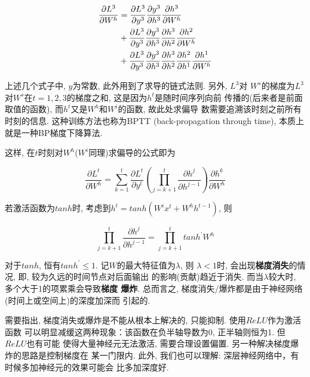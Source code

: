 \documentclass[UTF8, twocolumn]{ctexart}
\begin{document}
\begin{align}
\frac{\partial L^3}{\partial W^h} & = \frac{\partial L^3}{\partial y^3}
\frac{\partial y^3}{\partial h^3}\frac{\partial h^3}{\partial W^h}
\notag \\ & + \frac{\partial L^3}{\partial y^3}
\frac{\partial y^3}{\partial h^3}\frac{\partial h^3}{\partial h^2}
\frac{\partial h^2}{\partial W^h}
\notag \\ & + \frac{\partial L^3}{\partial y^3}
\frac{\partial y^3}{\partial h^3}\frac{\partial h^3}{\partial h^2}
\frac{\partial h^2}{\partial h^1}\frac{\partial h^1}{\partial W^h}
\end{align}


上述几个式子中, $\widehat{y}$为常数, 此外用到了求导的链式法则. 另外, $L^3$对
$W^s$的梯度为$L^3$对$W^s$在$t=1,2,3$的梯度之和, 这是因为$h^t$是随时间序列向前
传播的(后来者是前面取值的函数), 而$h^t$又是$W^h$和$W^i$的函数, 故此处求偏导
数需要追溯该时刻之前所有时刻的信息. 这种训练方法也称为BPTT
(back-propagation through time), 本质上就是一种BP梯度下降算法. 



这样, 在$t$时刻对$W^h$($W^i$同理)求偏导的公式即为\cite{3}

\begin{equation}
\frac{\partial L^t}{\partial W^h} = \sum_{k=1}^t 
\frac{\partial L^t}{\partial y^t}(\prod_{j=k+1}^{t} 
\frac{\partial h^{j}}{\partial h^{j-1}})\frac{\partial h^k}{\partial W^h}
\end{equation}

若激活函数为$tanh$时, 考虑到$h^t=tanh(W^i x^t + W^h h^{t-1})$, 则

\begin{equation}
\prod_{j=k+1}^{t} \frac{\partial h^{j}}{\partial h^{j-1}} =
\prod_{j=k+1}^{t} tanh^{\prime} W^h
\end{equation}

对于$tanh$, 恒有$tanh^{\prime} \leq 1$. 记$W$的最大特征值为$\lambda$, 则
$\lambda < 1$时, 会出现{\bf 梯度消失}的情况, 即, 较为久远的时间节点对后面输出
的影响(贡献)趋近于消失. 而当$\lambda$较大时, 多个大于1的项累乘会导致{\bf 梯度
爆炸}. 总而言之, 梯度消失/爆炸都是由于神经网络(时间上或空间上)的深度加深而
引起的\cite{4}. 



需要指出, 梯度消失或爆炸是不能从根本上解决的, 只能抑制. 使用$ReLU$作为激活函数
可以明显减缓这两种现象：该函数在负半轴导数为0, 正半轴则恒为1. 但$ReLU$也有可能
使得大量神经元无法激活, 需要合理设置偏置. 另一种解决梯度爆炸的思路是控制梯度在
某一门限内. 此外, 我们也可以理解: 深层神经网络中，有时候多加神经元的效果可能会
比多加深度好.
\end{document}
